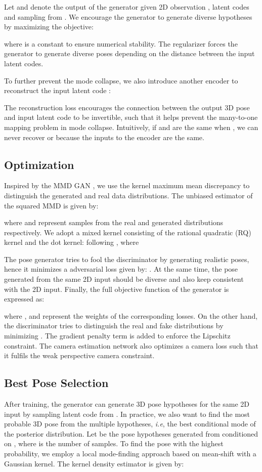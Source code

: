 \documentclass{bmvc2k}
\def\ie{\emph{i.e}\bmvaOneDot}
\begin{document}
Let  and  denote the output of the generator given 2D observation , latent codes  and  sampling from . We encourage the generator to generate diverse hypotheses by maximizing the objective:

where  is a constant to ensure numerical stability. The regularizer forces the generator to generate diverse poses depending on the distance between the input latent codes. 

To further prevent the mode collapse, we also introduce another encoder  to reconstruct the input latent code \cite{zhu2017toward}:

The reconstruction loss encourages the connection between the output 3D pose and input latent code to be invertible, such that it helps prevent the many-to-one mapping problem in mode collapse. Intuitively, if  and  are the same when , we can never recover  or  because the inputs to the encoder  are the same.

\subsection{Optimization}
Inspired by the MMD GAN \cite{li2017mmd, binkowski2018demystifying}, we use the kernel maximum mean discrepancy to distinguish the generated and real data distributions. The unbiased estimator of the squared MMD is given by:

where  and  represent samples from the real and generated distributions respectively. We adopt a mixed kernel consisting of the rational quadratic (RQ) kernel and the dot kernel:  following \cite{binkowski2018demystifying}, where


The pose generator tries to fool the discriminator by generating realistic poses, hence it minimizes a adversarial loss given by: . At the same time, the pose generated from the same 2D input should be diverse and also keep consistent with the 2D input. Finally, the full objective function of the generator is expressed as:

where ,   and  represent the weights of the corresponding losses. On the other hand, the discriminator tries to distinguish the real and fake distributions by minimizing . The gradient penalty  term \cite{arjovsky2017wasserstein} is added to enforce the Lipschitz constraint. The camera estimation network also optimizes a camera loss  \cite{Wandt2019RepNet}
such that it fulfils the weak perspective camera constraint.


\subsection{Best Pose Selection}
\label{pose_selection}
After training, the generator can generate 3D pose hypotheses for the same 2D input by sampling latent code  from . In practice, we also want to find the most probable 3D pose from the multiple hypotheses, \ie, the best conditional mode of the posterior distribution. 
Let  be the pose hypotheses generated from  conditioned on , where  is the number of samples. To find the pose with the highest probability, we employ a local mode-finding approach based on mean-shift \cite{comaniciu2002mean} with a Gaussian kernel. The kernel density estimator is given by: 
\end{document}

